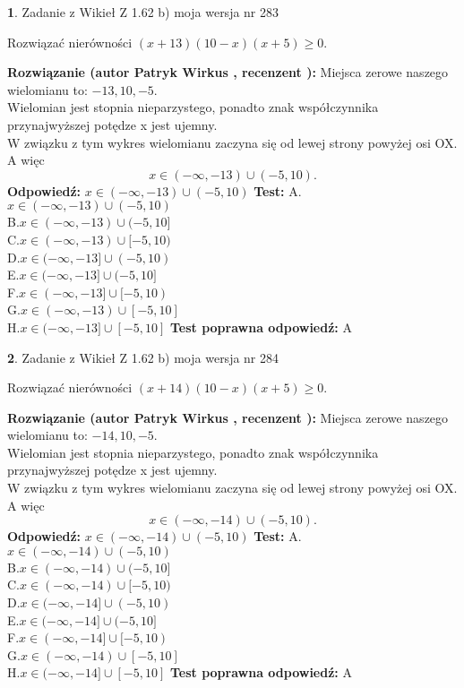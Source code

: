 \documentclass[12pt, a4paper]{article}
\theoremstyle{definition} %
\newtheorem{zad}{}
\newcommand{\zadStart}[1]{\begin{zad}#1\newline}
\newcommand{\zadStop}{\end{zad}}
\newcommand{\rozwStart}[2]{\noindent \textbf{Rozwiązanie (autor #1 , recenzent #2): }\newline}
\newcommand{\rozwStop}{\newline}
\newcommand{\odpStart}{\noindent \textbf{Odpowiedź:}\newline}
\newcommand{\odpStop}{\newline}
\newcommand{\testStart}{\noindent \textbf{Test:}\newline}
\newcommand{\testStop}{\newline}
\newcommand{\kluczStart}{\noindent \textbf{Test poprawna odpowiedź:}\newline}
\newcommand{\kluczStop}{\newline}
\begin{document}
\zadStart{Zadanie z Wikieł Z 1.62 b) moja wersja nr 283}

Rozwiązać nierówności $(x+13)(10-x)(x+5)\ge0$.
\zadStop
\rozwStart{Patryk Wirkus}{}
Miejsca zerowe naszego wielomianu to: $-13, 10, -5$.\\
Wielomian jest stopnia nieparzystego, ponadto znak współczynnika przy\linebreak najwyższej potędze x jest ujemny.\\ W związku z tym wykres wielomianu zaczyna się od lewej strony powyżej osi OX. A więc $$x \in (-\infty,-13) \cup (-5,10).$$
\rozwStop
\odpStart
$x \in (-\infty,-13) \cup (-5,10)$
\odpStop
\testStart
A.$x \in (-\infty,-13) \cup (-5,10)$\\
B.$x \in (-\infty,-13) \cup (-5,10]$\\
C.$x \in (-\infty,-13) \cup [-5,10)$\\
D.$x \in (-\infty,-13] \cup (-5,10)$\\
E.$x \in (-\infty,-13] \cup (-5,10]$\\
F.$x \in (-\infty,-13] \cup [-5,10)$\\
G.$x \in (-\infty,-13) \cup [-5,10]$\\
H.$x \in (-\infty,-13] \cup [-5,10]$
\testStop
\kluczStart
A
\kluczStop



\zadStart{Zadanie z Wikieł Z 1.62 b) moja wersja nr 284}

Rozwiązać nierówności $(x+14)(10-x)(x+5)\ge0$.
\zadStop
\rozwStart{Patryk Wirkus}{}
Miejsca zerowe naszego wielomianu to: $-14, 10, -5$.\\
Wielomian jest stopnia nieparzystego, ponadto znak współczynnika przy\linebreak najwyższej potędze x jest ujemny.\\ W związku z tym wykres wielomianu zaczyna się od lewej strony powyżej osi OX. A więc $$x \in (-\infty,-14) \cup (-5,10).$$
\rozwStop
\odpStart
$x \in (-\infty,-14) \cup (-5,10)$
\odpStop
\testStart
A.$x \in (-\infty,-14) \cup (-5,10)$\\
B.$x \in (-\infty,-14) \cup (-5,10]$\\
C.$x \in (-\infty,-14) \cup [-5,10)$\\
D.$x \in (-\infty,-14] \cup (-5,10)$\\
E.$x \in (-\infty,-14] \cup (-5,10]$\\
F.$x \in (-\infty,-14] \cup [-5,10)$\\
G.$x \in (-\infty,-14) \cup [-5,10]$\\
H.$x \in (-\infty,-14] \cup [-5,10]$
\testStop
\kluczStart
A
\kluczStop
\end{document}
